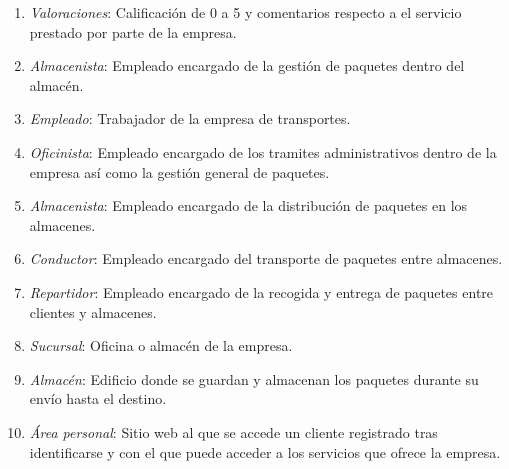 \begin{enumerate}
		\item \textit{Valoraciones}: Calificación de 0 a 5 y comentarios respecto a el servicio prestado por parte de la empresa.
		\item \textit{Almacenista}: Empleado encargado de la gestión de paquetes dentro del almacén.
		\item \textit{Empleado}: Trabajador de la empresa de transportes.
		\item \textit{Oficinista}: Empleado encargado de los tramites administrativos dentro de la empresa así como la gestión general de paquetes.
		\item \textit{Almacenista}: Empleado encargado de la distribución de paquetes en los almacenes.
		\item \textit{Conductor}: Empleado encargado del transporte de paquetes entre almacenes.	
		\item \textit{Repartidor}: Empleado encargado de la recogida y entrega de paquetes entre clientes y almacenes.
		\item \textit{Sucursal}: Oficina o almacén de la empresa.
		\item \textit{Almacén}: Edificio donde se guardan y almacenan los paquetes durante su envío hasta el destino.
		\item \textit{Área personal}: Sitio web al que se accede un cliente registrado tras identificarse y con el que puede acceder a los servicios que ofrece la empresa.
 	\end{enumerate}
\newpage



